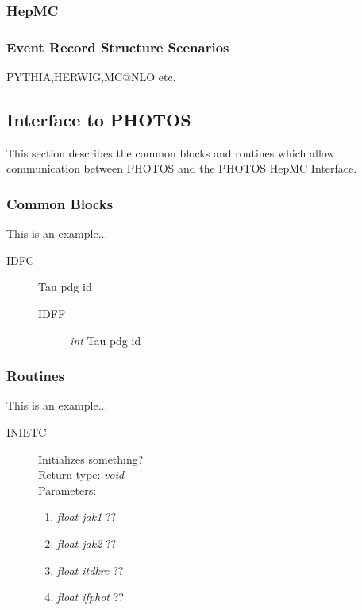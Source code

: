\documentclass[]{Photos_interface_design}
\begin{document}
\subsubsection{HepMC}
\subsubsection{Event Record Structure Scenarios}
PYTHIA,HERWIG,MC@NLO etc.

\subsection{Interface to PHOTOS}
This section describes the common blocks and routines which allow
communication between PHOTOS and the PHOTOS HepMC Interface.

\subsubsection{Common Blocks}

This is an example...

\begin{description}
\item[IDFC] Tau pdg id
    \begin{description}
    \item[IDFF] \textit{int} Tau pdg id
    \end{description}
\end{description}

\subsubsection{Routines}

This is an example...  

\begin{description}
\item[INIETC] Initializes something? \\
  Return type: \textit{void} \\
  Parameters:
  \begin{enumerate}
    \item \textit {float jak1} ??
    \item \textit {float jak2} ??
    \item \textit {float itdkrc} ??
    \item \textit {float ifphot} ??
  \end{enumerate}
\end{description}
\end{document}
